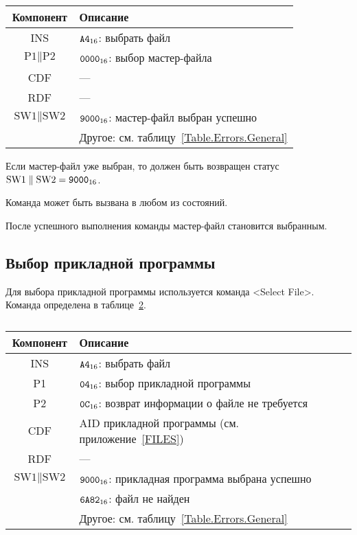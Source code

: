 \begin{table}[hbt]
\caption{}\label{Table.Oper.SelectMFCmd}
\begin{tabular}{|c|p{14cm}|}
\hline
Компонент & Описание \\
\hline
\hline
INS & $\texttt{A4}_{16}$: выбрать файл\\ 
\hline
$\text{P1} \parallel \text{P2}$ & $\texttt{0000}_{16}$: выбор мастер-файла\\
\hline
CDF & --- \\
\hline 
RDF &  --- \\
\hline
$\text{SW1}\parallel\text{SW2}$ & 
$\texttt{9000}_{16}$: мастер-файл выбран успешно \\
\cline{2-2}
  & Другое: см. таблицу~\ref{Table.Errors.General} \\
\hline
\end{tabular}
\end{table}

Если мастер-файл уже выбран, то должен быть возвращен 
статус $\text{SW1} \parallel \text{SW2} = \texttt{9000}_{16}$.

Команда может быть вызвана в любом из состояний.

После успешного выполнения команды мастер-файл становится выбранным.

\subsection{Выбор прикладной программы}
\label{Oper.Descr.SelectApp}

Для выбора прикладной программы используется команда <Select File>. 
Команда определена в таблице~\ref{Table.Oper.SelectAppCmd}.

\begin{table}[hbt]
\caption{}\label{Table.Oper.SelectAppCmd}
\begin{tabular}{|c|p{14cm}|}
\hline
Компонент & Описание \\
\hline
\hline
INS & $\texttt{A4}_{16}$: выбрать файл\\ 
\hline
P1 & $\texttt{04}_{16}$: выбор прикладной программы\\
\hline
P2 & $\texttt{0C}_{16}$: возврат информации о файле не требуется \\
\hline
CDF & AID прикладной программы (см. приложение~\ref{FILES})\\
\hline 
RDF &  --- \\
\hline
$\text{SW1}\parallel\text{SW2}$ & 
$\texttt{9000}_{16}$: прикладная программа выбрана успешно \\
\cline{2-2}
  & $\texttt{6A82}_{16}$: файл не найден \\
\cline{2-2}
  & Другое: см. таблицу~\ref{Table.Errors.General}\\
\hline
\end{tabular}
\end{table}


